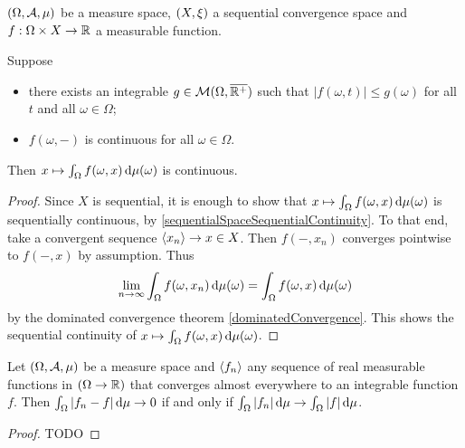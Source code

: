 \begin{lemma} \label{continuityIntegralTwoParameterFunction}
$\sSet{\Omega, \mathcal{A}, \mu}$ be a measure space, $\sSet{X,\xi}$ a sequential convergence space and $f: \Omega\times X \to \mathbb{R}$ a measurable function.

Suppose
\begin{itemize}
\item there exists an integrable $g\in\operatorname{\mathcal{M}}(\Omega, \overline{\mathbb{R}^+})$ such that $|f(\omega,t)| \leq g(\omega)$ for all $t$ and all $\omega\in \Omega$;
\item $f(\omega, -)$ is continuous for all $\omega\in\Omega$.
\end{itemize}
Then $x\mapsto \int_\Omega f(\omega, x)\operatorname{d \!}{\mu}(\omega)$ is continuous.
\end{lemma}
\begin{proof}
Since $X$ is sequential, it is enough to show that $x\mapsto \int_\Omega f(\omega, x)\operatorname{d \!}{\mu}(\omega)$ is sequentially continuous, by \ref{sequentialSpaceSequentialContinuity}. To that end, take a convergent sequence $\left\langle x_n \right\rangle\to x\in X$. Then $f(-, x_n)$ converges pointwise to $f(-,x)$ by assumption. Thus
\[ \lim_{n\to \infty} \int_\Omega f(\omega, x_n)\operatorname{d \!}{\mu}(\omega) = \int_\Omega f(\omega, x)\operatorname{d \!}{\mu}(\omega) \]
by the dominated convergence theorem \ref{dominatedConvergence}. This shows the sequential continuity of $x\mapsto \int_\Omega f(\omega, x)\operatorname{d \!}{\mu}(\omega)$.
\end{proof}

\begin{proposition} \label{ScheffesLemma}
Let $\sSet{\Omega, \mathcal{A}, \mu}$ be a measure space and $\left\langle f_n \right\rangle$ any sequence of real measurable functions in $(\Omega\to\mathbb{R})$ that converges almost everywhere to an integrable function $f$. Then $\int_\Omega |f_n - f|\operatorname{d \!}{\mu} \to 0$ \textup{if and only if} $\int_\Omega |f_n|\operatorname{d \!}{\mu} \to \int_\Omega |f|\operatorname{d \!}{\mu}$.
\end{proposition}
\begin{proof}
TODO
\end{proof}

